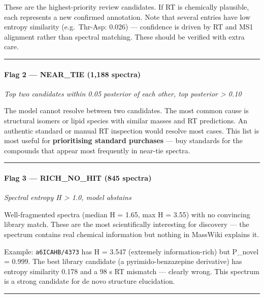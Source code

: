 These are the highest-priority review candidates. If RT is chemically
plausible, each represents a new confirmed annotation. Note that several
entries have low entropy similarity (e.g.~Thr-Asp: 0.026) --- confidence
is driven by RT and MS1 alignment rather than spectral matching. These
should be verified with extra care.

\begin{center}\rule{0.5\linewidth}{0.5pt}\end{center}

\paragraph{Flag 2 --- NEAR\_TIE (1,188
spectra)}\label{flag-2-near_tie-1188-spectra}

\emph{Top two candidates within 0.05 posterior of each other, top
posterior \textgreater{} 0.10}

The model cannot resolve between two candidates. The most common cause
is structural isomers or lipid species with similar masses and RT
predictions. An authentic standard or manual RT inspection would resolve
most cases. This list is most useful for \textbf{prioritising standard
purchases} --- buy standards for the compounds that appear most
frequently in near-tie spectra.

\begin{center}\rule{0.5\linewidth}{0.5pt}\end{center}

\paragraph{Flag 3 --- RICH\_NO\_HIT (845
spectra)}\label{flag-3-rich_no_hit-845-spectra}

\emph{Spectral entropy H \textgreater{} 1.0, model abstains}

Well-fragmented spectra (median H = 1.65, max H = 3.55) with no
convincing library match. These are the most scientifically interesting
for discovery --- the spectrum contains real chemical information but
nothing in MassWiki explains it.

Example: \texttt{a6ICAHB/4373} has H = 3.547 (extremely
information-rich) but P\_novel = 0.999. The best library candidate (a
pyrimido-benzazepine derivative) has entropy similarity 0.178 and a 98 s
RT mismatch --- clearly wrong. This spectrum is a strong candidate for
de novo structure elucidation.

\begin{center}\rule{0.5\linewidth}{0.5pt}\end{center}

